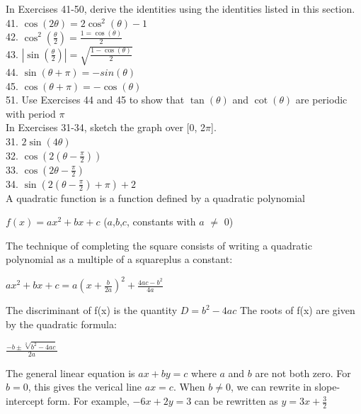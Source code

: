 \documentclass{article}
\begin{document}
In Exercises 41-50, derive the identities using the identities listed in this section.\\

41. $\cos(2\theta) = 2\cos^2(\theta) - 1$\\
42. $\cos^2(\frac{\theta}{2}) = \frac{1 = \cos(\theta)}{2}$\\
43. $\left|\sin(\frac{\theta}{2})\right| = \sqrt{\frac{1 - \cos(\theta)}{2}}$\\
44. $\sin(\theta + \pi) = -sin(\theta)$\\
45. $\cos(\theta + \pi) = -\cos(\theta)$\\
51. Use Exercises 44 and 45 to show that $\tan(\theta)$ and $\cot(\theta)$ are periodic with period $\pi$\\

In Exercises 31-34, sketch the graph over [0, 2$\pi$].\\
31. $2\sin(4\theta)$\\
32. $\cos(2(\theta - \frac{\pi}{2}))$\\
33. $\cos(2\theta - \frac{\pi}{2})$\\
34. $\sin(2(\theta - \frac{\pi}{2}) + \pi) + 2$\\

A quadratic function is a function defined by a quadratic polynomial\\
\begin{center}$f(x) = ax^2 + bx + c$ ($a$,$b$,$c$, constants with $a$ $\neq$ 0)\\\end{center}

The technique of completing the square consists of writing a quadratic polynomial as a multiple of a squareplus a constant:\\
\begin{center}$ax^2 + bx + c = a(x + \frac{b}{2a})^2 + \frac{4ac-b^2}{4a}$\\\end{center}

The discriminant of f(x) is the quantity $D = b^2 - 4ac$ The roots of f(x) are given by the quadratic formula:\\
\begin{center}$\frac{-b \pm \sqrt[2]{b^2 - 4ac}}{2a}$ \end{center}

The general linear equation is $ax + by = c$ where $a$ and $b$ are not both zero. For $b = 0$, this gives the verical line $ax = c$. When $b \neq 0$, we can rewrite in slope-intercept form. For example, $-6x + 2y =3$ can be rewritten as $y = 3x + \frac{3}{2}$\\
\end{document}
